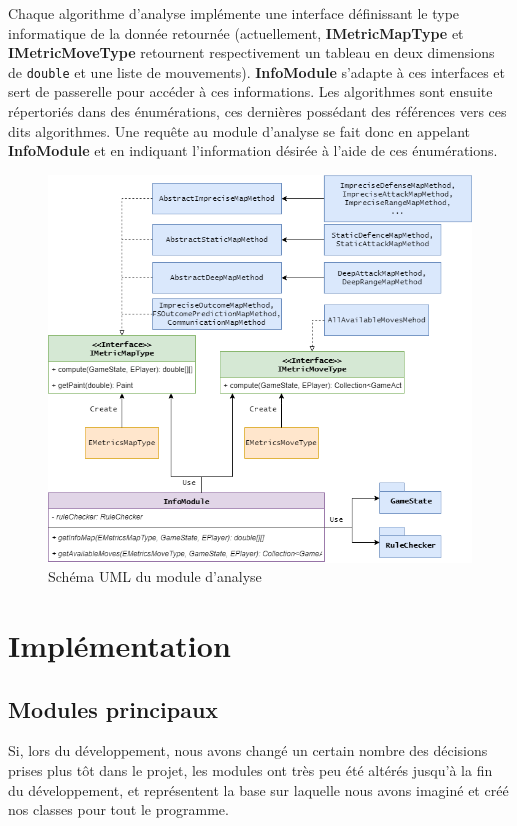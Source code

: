 \documentclass[a4paper]{report}
\begin{document}
Chaque algorithme d'analyse implémente une interface définissant le type informatique de la donnée retournée (actuellement, \textbf{IMetricMapType} et \textbf{IMetricMoveType} retournent respectivement un tableau en deux dimensions de \texttt{double} et une liste de mouvements). \textbf{InfoModule} s'adapte à ces interfaces et sert de passerelle pour accéder à ces informations.
Les algorithmes sont ensuite répertoriés dans des énumérations, ces dernières possédant des références vers ces dits algorithmes. Une requête au module d'analyse se fait donc en appelant \textbf{InfoModule} et en indiquant l'information désirée à l'aide de ces énumérations.


\begin{figure}[!h]
\includegraphics[width=1\textwidth]{UML/umlAnalyse.png}
\caption{Schéma UML du module d'analyse}\label{uml:analyse}
\centering
\end{figure}

\chapter{Implémentation}
\section{Modules principaux}

Si, lors du développement, nous avons changé un certain nombre des décisions prises plus tôt dans le projet, les modules ont très peu été altérés jusqu’à la fin du développement, et représentent la base sur laquelle nous avons imaginé et créé nos classes pour tout le programme.
\end{document}
